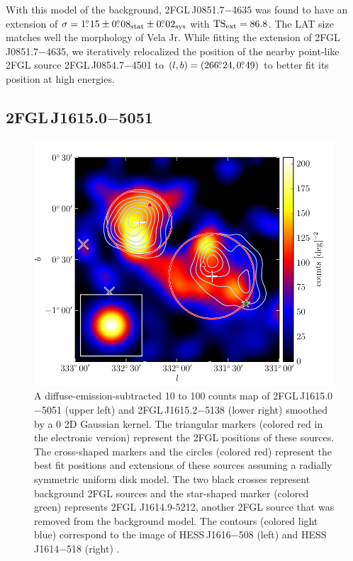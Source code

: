 With this model of the background, 2FGL\,J0851.7$-$4635 was found to
have an extension of $\sigma=1\mbox{$.\!\!^\circ$}15\pm0\mbox{$.\!\!^\circ$}08_\text{stat}\pm0\mbox{$.\!\!^\circ$}02_\text{sys}$
with $\mathrm{TS}_\mathrm{ext}=86.8$.  The LAT size matches well the \tev morphology
of Vela Jr.  While fitting the extension of 2FGL\,J0851.7$-$4635,
we iteratively relocalized the position of the nearby point-like 2FGL
source 2FGL\,J0854.7$-$4501 to $(l,b)=(266\mbox{$.\!\!^\circ$}24,0\mbox{$.\!\!^\circ$}49)$ to better
fit its position at high energies.
    
\subsection{2FGL\,J1615.0$-$5051}

\begin{figure}[htbp]
  \includegraphics{chapters/extended_search/figures/source_plots/source_HESS_J1614-518_color.pdf}
  \caption{A diffuse-emission-subtracted 10 \gev to 100 \gev counts map
  of 2FGL\,J1615.0$-$5051 (upper left) and 2FGL\,J1615.2$-$5138 (lower
  right) smoothed by a 0 2D Gaussian kernel.  The triangular markers
  (colored red in the electronic version) represent the 2FGL positions
  of these sources.  The cross-shaped markers and the circles (colored
  red) represent the best fit positions and extensions of these sources
  assuming a radially symmetric uniform disk model.  The two black
  crosses represent  background 2FGL sources and the star-shaped marker
  (colored green) represents 2FGL J1614.9-5212, another 2FGL source
  that was removed from the background model. The contours (colored
  light blue) correspond to the \tev image of HESS\,J1616$-$508 (left)
  and HESS\,J1614$-$518 (right) \citep{aharonian_2006a_h.e.s.s.-survey}.}
\end{figure}

